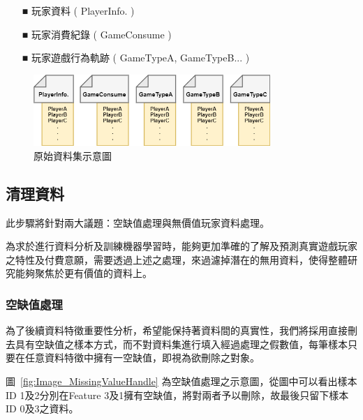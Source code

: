 \begin{itemize}
  \item[■] 玩家資料 ( PlayerInfo. )
  \item[■] 玩家消費紀錄 ( GameConsume )
  \item[■] 玩家遊戲行為軌跡 ( GameTypeA, GameTypeB... )
\end{itemize} 

\begin{figure}[!htb]
  \begin{center}
    \includegraphics[width=0.8\textwidth]{figures/Image_OriginalDatasets.png}
    \caption[原始資料集示意圖]{原始資料集示意圖}
    \label{fig:Image_OriginalDatasets}
  \end{center}
\end{figure}

\subsection{清理資料}

此步驟將針對兩大議題：空缺值處理與無價值玩家資料處理。

為求於進行資料分析及訓練機器學習時，能夠更加準確的了解及預測真實遊戲玩家之特性及付費意願，需要透過上述之處理，來過濾掉潛在的無用資料，使得整體研究能夠聚焦於更有價值的資料上。
\newpage

\subsubsection{空缺值處理}
\label{subsubsec:MissingValueHandle}

為了後續資料特徵重要性分析，希望能保持著資料間的真實性，我們將採用直接刪去具有空缺值之樣本方式，而不對資料集進行填入經過處理之假數值，每筆樣本只要在任意資料特徵中擁有一空缺值，即視為欲刪除之對象。

圖~\ref{fig:Image_MissingValueHandle} 為空缺值處理之示意圖，從圖中可以看出樣本ID 1及2分別在Feature 3及1擁有空缺值，將對兩者予以刪除，故最後只留下樣本ID 0及3之資料。

